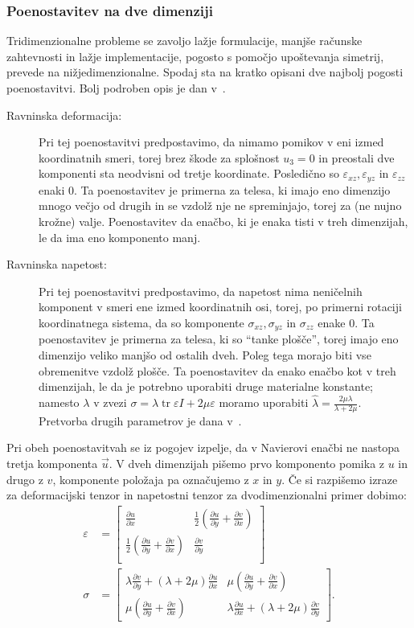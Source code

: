 \documentclass[12pt,a4paper,twoside]{article}
\theoremstyle{definition} %
\theoremstyle{plain} %
\numberwithin{equation}{section}
\newcommand{\eps}{\varepsilon}
\newcommand{\dpar}[2]{\ensuremath{\frac{\partial #1}{\partial #2}}}
\newcommand{\vu}{\vec{u}}
\newcommand{\ts}{\sigma}
\DeclareMathOperator{\tr}{tr}
\begin{document}
\subsubsection{Poenostavitev na dve dimenziji}
Tridimenzionalne probleme se zavoljo lažje formulacije, manjše računske zahtevnosti in lažje
implementacije, pogosto s pomočjo upoštevanja simetrij, prevede na nižjedimenzionalne. Spodaj sta na
kratko opisani dve najbolj pogosti poenostavitvi. Bolj podroben opis je dan
v~\cite[str.~260--278]{slaughter2012linearized}.

\begin{description}
  \item[Ravninska deformacija:]
    Pri tej poenostavitvi predpostavimo, da nimamo pomikov v eni izmed koordinatnih smeri, torej
    brez škode za splošnost $u_3 = 0$ in preostali dve komponenti sta neodvisni od tretje
    koordinate. Posledično so $\eps_{xz}, \eps_{yz}$ in $\eps_{zz}$ enaki 0. Ta poenostavitev je
    primerna za telesa, ki imajo eno dimenzijo mnogo večjo od drugih in se vzdolž nje ne
    spreminjajo, torej za (ne nujno krožne) valje. Poenostavitev da enačbo, ki je enaka tisti v
    treh dimenzijah, le da ima eno komponento manj.
  \item[Ravninska napetost:]
    Pri tej poenostavitvi predpostavimo, da napetost nima neničelnih komponent v smeri ene izmed
    koordinatnih osi, torej, po primerni rotaciji koordinatnega sistema, da so komponente $\ts_{xz},
    \ts_{yz}$ in $\ts_{zz}$ enake 0. Ta poenostavitev je primerna za telesa, ki so ``tanke plošče'',
    torej imajo eno dimenzijo veliko manjšo od ostalih dveh. Poleg tega morajo biti vse obremenitve
    vzdolž plošče. Ta poenostavitev da enako enačbo kot v treh dimenzijah, le da je potrebno
    uporabiti druge materialne konstante; namesto $\lambda$ v zvezi $\sigma = \lambda \tr\eps I + 2
    \mu \eps$ moramo uporabiti $\hat\lambda = \frac{2 \mu \lambda}{\lambda + 2 \mu}$. Pretvorba
    drugih parametrov je dana v~\cite[str.\ 276, tabela 7.1]{slaughter2012linearized}.
\end{description}

Pri obeh poenostavitvah se iz pogojev izpelje, da v Navierovi enačbi ne nastopa tretja komponenta
$\vu$. V dveh dimenzijah pišemo prvo komponento pomika z $u$ in drugo z $v$, komponente položaja pa
označujemo z $x$ in $y$. Če si razpišemo izraze za deformacijski tenzor in napetostni tenzor za
dvodimenzionalni primer dobimo:
\begin{align}
  \eps &=
  \begin{bmatrix}
    \dpar{u}{x} & \frac12(\dpar{u}{y} + \dpar{v}{x}) \\
    \frac12(\dpar{u}{y} + \dpar{v}{x}) & \dpar{v}{y} \\
  \end{bmatrix}
  \\
  \ts &=
  \begin{bmatrix}
    \lambda \dpar{v}{y} + (\lambda+2\mu) \dpar{u}{x} &
    \mu(\dpar{u}{y} + \dpar{v}{x}) \\
    \mu(\dpar{u}{y} + \dpar{v}{x}) &
    \lambda \dpar{u}{x} + (\lambda+2\mu) \dpar{v}{y}
  \end{bmatrix}.
\end{align}
\end{document}
